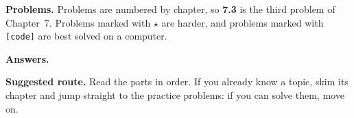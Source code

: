 \documentclass[11pt,a4paper,twoside]{book}
\begin{document}
\textbf{Problems.} Problems are numbered by chapter, so \textbf{7.3} is the third problem of Chapter~7. Problems marked with $\star$ are harder, and problems marked with \texttt{[code]} are best solved on a computer.

\textbf{Answers.} 

\textbf{Suggested route.} Read the parts in order. If you already know a topic, skim its chapter and jump straight to the practice problems: if you can solve them, move on.




\mainmatter

\end{document}
